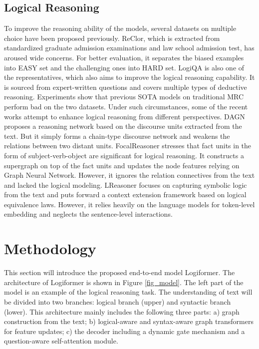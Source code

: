 \documentclass[sigconf]{acmart}
\begin{document}
\subsection{Logical Reasoning}
To improve the reasoning ability of the models, several datasets on multiple choice have been proposed previously. ReClor\cite{yu2019reclor}, which is extracted from standardized graduate admission examinations and law school admission test, has aroused wide concerns. For better evaluation, it separates the biased examples into EASY set and the challenging ones into HARD set. LogiQA \cite{liu2020logiqa} is also one of the representatives, which also aims to improve the logical reasoning capability. It is sourced from expert-written questions and covers multiple types of deductive reasoning. Experiments show that previous SOTA models on traditional MRC perform bad on the two datasets. Under such circumstances, some of the recent works attempt to enhance logical reasoning from different perspectives. DAGN\cite{huang2021dagn} proposes a reasoning network based on the discourse units extracted from the text. But it simply forms a chain-type discourse network and weakens the relations between two distant units. FocalReasoner \cite{ouyang2021fact} stresses that fact units in the form of subject-verb-object are significant for logical reasoning. It constructs a supergraph on top of the fact units and updates the node features relying on Graph Neural Network. However, it ignores the relation connectives from the text and lacked the logical modeling. LReasoner \cite{wang2021logic} focuses on capturing symbolic logic from the text and puts forward a context extension framework based on logical equivalence laws. However, it relies heavily on the language models for token-level embedding and neglects the sentence-level interactions.


\section{Methodology}
This section will introduce the proposed end-to-end model Logiformer. The architecture of Logiformer is shown in Figure \ref{fig_model}. The left part of the model is an example of the logical reasoning task. The understanding of text will be divided into two branches: logical branch (upper) and syntactic branch (lower). This architecture mainly includes the following three parts: a) graph construction from the text; b) logical-aware and syntax-aware graph transformers for feature updates; c) the decoder including a dynamic gate mechanism and a question-aware self-attention module.
\end{document}
